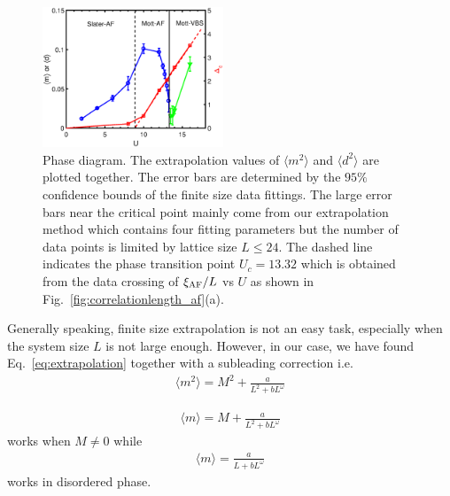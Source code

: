 \documentclass[twocolumn,superscriptaddress]{revtex4-1}
\begin{document}
\begin{figure}
    \includegraphics[width=0.48\textwidth]{phasediagram}
    \caption{\label{fig:phasediagram}Phase diagram. The extrapolation values of $\langle m^2 \rangle$ and $\langle d^2 \rangle$ are plotted together. The error bars are determined by the $95\%$ confidence bounds of the finite size data fittings. The large error bars near the critical point mainly come from our extrapolation method which contains four fitting parameters but the number of data points is limited by lattice size $L\le24$. The dashed line indicates the phase transition point $U_c=13.32$ which is obtained from the data crossing of $\xi_{\rm AF}/L$ vs $U$ as shown in Fig.~\ref{fig:correlationlength_af}(a).}
\end{figure}



Generally speaking, finite size extrapolation is not an easy task, especially when the system size $L$ is not large enough. However, in our case, we have found Eq.~\ref{eq:extrapolation} together with a subleading correction \cite{Sandvik2010a} i.e.
\begin{eqnarray}\label{eq:extrapolation_magic}
  \langle m^2 \rangle=M^2+\frac{a}{L^2+bL^\omega}
\end{eqnarray}

\begin{eqnarray}\label{eq:extrapolation_magic}
\langle m \rangle=M+\frac{a}{L^2+bL^\omega}
\end{eqnarray}
works when $M\ne0$
while
\begin{eqnarray}\label{eq:extrapolation_magic}
\langle m \rangle=\frac{a}{L+bL^\omega}
\end{eqnarray}
works in disordered phase.
\end{document}
